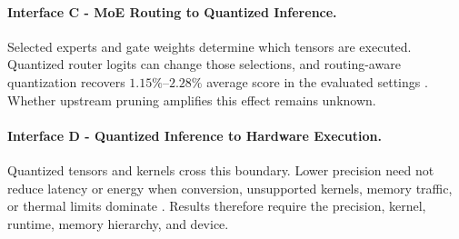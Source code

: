 \documentclass[10pt]{article}
\newenvironment{reviewchange}{\begingroup\color{red}}{\endgroup}
\begin{document}
\paragraph{Interface C - MoE Routing to Quantized Inference.}
Selected experts and gate weights determine which tensors are executed.  Quantized
router logits can change those selections, and routing-aware quantization recovers
$1.15\%$--$2.28\%$ average score in the evaluated settings
\citep{fu2026eaquantenhancingposttrainingquantization,park2026valueandstructurealignmentroutingconsistentquantization}.
Whether upstream pruning amplifies this effect remains unknown.

\begin{reviewchange}
\paragraph{Interface D - Quantized Inference to Hardware Execution.}
Quantized tensors and kernels cross this boundary.  Lower precision need not reduce
latency or energy when conversion, unsupported kernels, memory traffic, or thermal
limits dominate
\citep{chung2026joulesgodiagnosinginference,tschand2025mlperfpowerbenchmarkingenergy,sukthanker2024hwgptbenchhardwareawarearchitecturebenchmark}.
Results therefore require the precision, kernel, runtime, memory hierarchy, and device.
\end{reviewchange}
\end{document}
